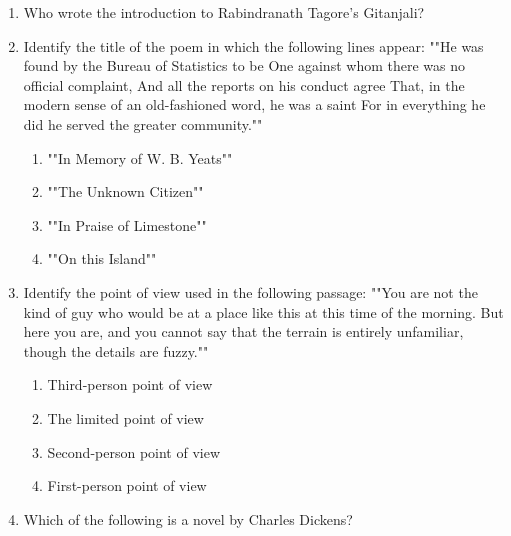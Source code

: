 \documentclass[12pt]{article}
\theoremstyle{remark}
\begin{document}
\begin{enumerate}
\begin{enumerate}
\begin{multicols}{2}
\end{multicols} \end{enumerate}
\hfill{}
\item Who wrote the introduction to Rabindranath Tagore's Gitanjali? 
\begin{enumerate}  \end{enumerate}
\hfill{}
\item Identify the title of the poem in which the following lines appear: 
""He was found by the Bureau of Statistics to be
One against whom there was no official complaint,
And all the reports on his conduct agree
That, in the modern sense of an old-fashioned word, he was a saint
For in everything he did he served the greater community."" 
\begin{enumerate} 
\item ""In Memory of W. B. Yeats"" 
\item ""The Unknown Citizen"" 
\item ""In Praise of Limestone"" 
\item ""On this Island"" 
\end{enumerate}
\hfill{}
\item Identify the point of view used in the following passage:
""You are not the kind of guy who would be at a place like this at this time of the
morning. But here you are, and you cannot say that the terrain is entirely
unfamiliar, though the details are fuzzy."" 
\begin{enumerate} 
\item Third-person point of view 
\item The limited point of view 
\item Second-person point of view 
\item First-person point of view 
\end{enumerate}
\hfill{}
\item Which of the following is a novel by Charles Dickens? 
\begin{enumerate} 
\end{enumerate}
\end{enumerate}
\end{document}
